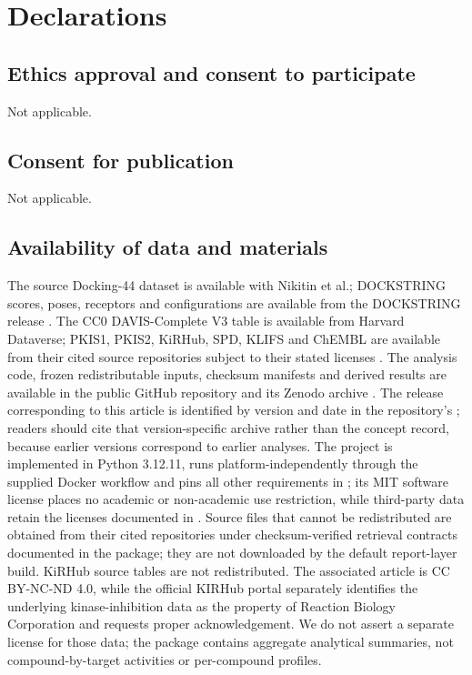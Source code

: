 \documentclass[11pt]{article}
\begin{document}
\section*{Declarations}

\subsection*{Ethics approval and consent to participate}

Not applicable.

\subsection*{Consent for publication}

Not applicable.

\subsection*{Availability of data and materials}

The source Docking-44 dataset is available with Nikitin et al.; DOCKSTRING scores, poses,
receptors and configurations are available from the DOCKSTRING release
\cite{nikitin2025,dockstring2022}. The CC0 DAVIS-Complete V3 table is available from Harvard
Dataverse; PKIS1, PKIS2, KiRHub, SPD, KLIFS and ChEMBL are available from their cited
source repositories subject to their stated licenses \cite{wu2025davis}. The
analysis code, frozen redistributable inputs, checksum manifests and derived results are
available in the public GitHub repository and its Zenodo archive
\cite{softwaregithub,softwarezenodo}. The release corresponding to this article is identified
by version and date in the repository's ; readers should cite that
version-specific archive rather than the concept record, because earlier versions correspond
to earlier analyses. The  project is implemented in
Python 3.12.11, runs platform-independently through the supplied Docker workflow and pins
all other requirements in ; its MIT software license places no
academic or non-academic use restriction, while third-party data retain the licenses
documented in . Source files that cannot be redistributed are obtained
from their cited repositories under checksum-verified retrieval contracts documented in the
package; they are not downloaded by the default report-layer build. KiRHub source tables
are not redistributed. The associated article is CC BY-NC-ND 4.0, while the official
KIRHub portal separately identifies the underlying kinase-inhibition data as the property
of Reaction Biology Corporation and requests proper acknowledgement. We do not assert a
separate license for those data; the package contains aggregate analytical summaries, not
compound-by-target activities or per-compound profiles.
\end{document}

